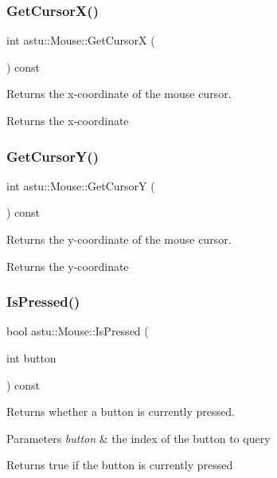 \subsubsection{\texorpdfstring{Get\+Cursor\+X()}{GetCursorX()}}
{\footnotesize\ttfamily int astu\+::\+Mouse\+::\+Get\+CursorX (\begin{DoxyParamCaption}{ }\end{DoxyParamCaption}) const}

Returns the x-\/coordinate of the mouse cursor.

\begin{DoxyReturn}{Returns}
the x-\/coordinate 
\end{DoxyReturn}
\mbox{\label{classastu_1_1Mouse_a8f008ad4c4a9cba165ff74e44b0bdb17}} 
\subsubsection{\texorpdfstring{Get\+Cursor\+Y()}{GetCursorY()}}
{\footnotesize\ttfamily int astu\+::\+Mouse\+::\+Get\+CursorY (\begin{DoxyParamCaption}{ }\end{DoxyParamCaption}) const}

Returns the y-\/coordinate of the mouse cursor.

\begin{DoxyReturn}{Returns}
the y-\/coordinate 
\end{DoxyReturn}
\mbox{\label{classastu_1_1Mouse_a400f6483be85ac0e4694806bdd22e25a}} 
\subsubsection{\texorpdfstring{Is\+Pressed()}{IsPressed()}}
{\footnotesize\ttfamily bool astu\+::\+Mouse\+::\+Is\+Pressed (\begin{DoxyParamCaption}\item[{int}]{button }\end{DoxyParamCaption}) const}

Returns whether a button is currently pressed.


\begin{DoxyParams}{Parameters}
{\em button} & the index of the button to query \\
\hline
\end{DoxyParams}
\begin{DoxyReturn}{Returns}
{\ttfamily true} if the button is currently pressed 
\end{DoxyReturn}
\mbox{\label{classastu_1_1Mouse_a1f60d23fe113d85a80569a5a3539eabf}} 
